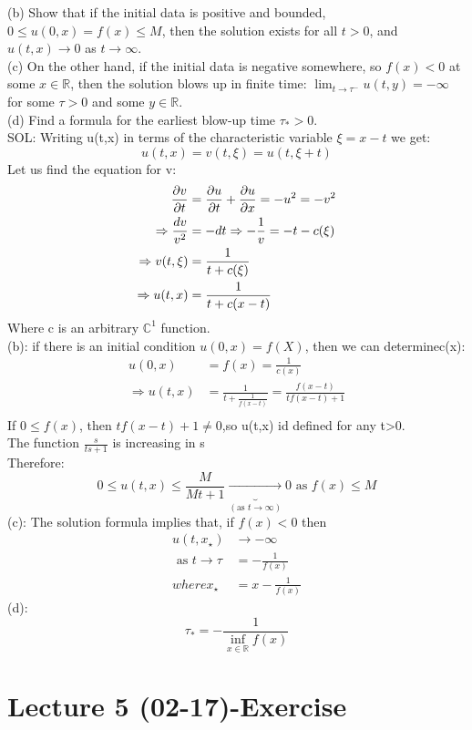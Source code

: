 \begin{enumerate}[label=\circled{\arabic*}]
(b) Show that if the initial data is positive and bounded, $0\leq u(0,x)=f(x)\leq M$, then the solution exists for all $t>0$, and $u(t,x)\rightarrow 0$ as $t\rightarrow \infty$. \\
(c) On the other hand, if the initial data is negative somewhere, so $f(x)<0$ at some $x\in\mathbb{R}$, then the solution blows up in finite time: $\lim_{t\rightarrow\tau^{-}}u(t,y)=-\infty$ for some $\tau>0$ and some $y\in\mathbb{R}$.\\
(d) Find a formula for the earliest blow-up time $\tau_{*}>0$.
\\SOL: Writing u(t,x) in terms of the characteristic variable $\xi=x-t$ we get:
$$
    u(t,x)=v(t,\xi)=u(t,\xi+t)
$$ 
Let us find the equation for v:
\begin{align*}{}{}
\pdv{v}{t}&=\pdv{u}{t}+\pdv{u}{x}=-u^2=-v^2\\
\Rightarrow \frac{dv}{v^2}&=-dt \Rightarrow -\frac{1}{v}=-t-c(\xi)\\
\Rightarrow v(t,\xi)&=\frac{1}{t+c(\xi)}\\
\Rightarrow u(t,x)&=\frac{1}{t+c(x-t)}\\
\end{align*}
Where c is an arbitrary $ \mathbb{C}^1 $ function.\\
(b): if there is an initial condition $ u(0,x)=f(X) $, then we can determinec(x):\begin{align*}{}{}
u(0,x)&=f(x)=\frac{1}{c(x)}\\
\Rightarrow u(t,x)&=\frac{1}{t+\frac{1}{f(x-t)}}=\frac{f(x-t)}{tf(x-t)+1}\\
\end{align*} 
If $ 0\leq f(x) $, then $ tf(x-t)+1\neq0 $,so u(t,x) id defined for any t>0.\\
The function $ \frac{s}{ts+1} $ is increasing in s\\
Therefore:$$
    0\leq  u(t,x)\leq \frac{M}{Mt+1}\underbrace{\rightarrow}_{(\text{as } t\rightarrow\infty)} 0 \text{ as } f(x)\leq M
$$   
(c): The solution formula implies that, if $ f(x)<0 $ then\begin{align*}{}{}
u(t,x_\star)&\rightarrow-\infty \\
\text{ as } t\rightarrow\tau&=-\frac{1}{f(x)}\\
where x_\star&=x-\frac{1}{f(x)}
\end{align*} 
(d): $$
    \tau_{*}=-\frac{1}{\inf_{x\in \mathbb{R}}f(x)}
$$ 
\end{enumerate}
\section{Lecture 5 (02-17)-Exercise}
